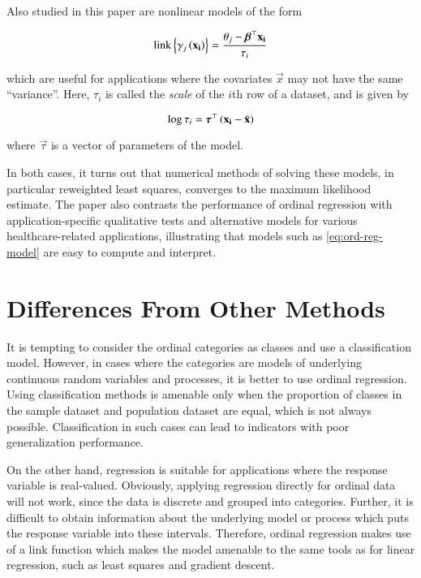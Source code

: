 \documentclass[journal,12pt,twocolumn]{IEEEtran}
\begin{document}
Also studied in this paper are nonlinear models of the form

\begin{equation}
     \mathrm{link}\left\{\gamma_j\left(\boldsymbol{\mathbf{x_i}}\right)\right\} = \frac{\theta_j - \boldsymbol{\mathbf{\beta}}^\top\boldsymbol{\mathbf{x_i}}}{\tau_i}
     \label{eq:nl-ord-reg-model}
\end{equation}

which are useful for applications where the covariates \(\vec{x}\) may not have
the same ``variance''. Here, \(\tau_i\) is called the \emph{scale} of the
\(i\)th row of a dataset, and is given by

\begin{equation}
     \log\tau_i = \boldsymbol{\mathbf{\tau}}^\top\left(\boldsymbol{\mathbf{x_i}}-\bar{\boldsymbol{\mathbf{x}}}\right)
\end{equation}

where \(\vec{\tau}\) is a vector of parameters of the model.

In both cases, it turns out that numerical methods of solving these models, in
particular reweighted least squares, converges to the maximum likelihood
estimate. The paper also contrasts the performance of ordinal regression with
application-specific qualitative tests and alternative models for various
healthcare-related applications, illustrating that models such as
\eqref{eq:ord-reg-model} are easy to compute and interpret.

\section{Differences From Other Methods}

It is tempting to consider the ordinal categories as classes and use a
classification model. However, in cases where the categories are models of
underlying continuous random variables and processes, it is better to use
ordinal regression. Using classification methods is amenable only when the
proportion of classes in the sample dataset and population dataset are equal,
which is not always possible. Classification in such cases can lead to
indicators with poor generalization performance.

On the other hand, regression is suitable for applications where the response
variable is real-valued. Obviously, applying regression directly for ordinal
data will not work, since the data is discrete and grouped into categories.
Further, it is difficult to obtain information about the underlying model or
process which puts the response variable into these intervals. Therefore,
ordinal regression makes use of a link function which makes the model amenable
to the same tools as for linear regression, such as least squares and gradient
descent.
\end{document}
